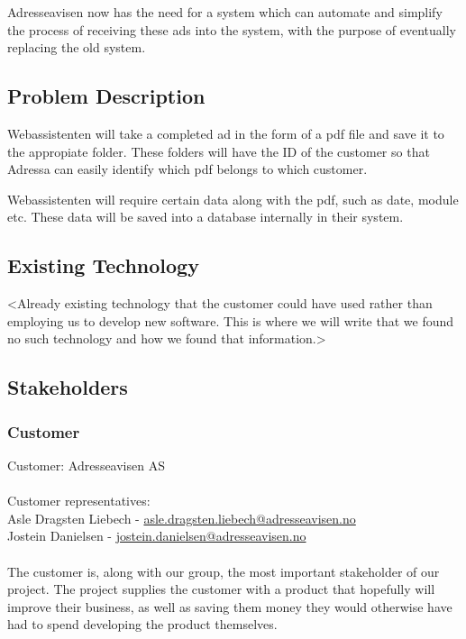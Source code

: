 Adresseavisen now has the need for a system which can automate and simplify the process of receiving these ads into the system, with the purpose of eventually replacing the old system.

\subsection{Problem Description}
Webassistenten will take a completed ad in the form of a pdf file and save it to the appropiate folder. These folders will have the ID of the customer so that Adressa can easily identify which pdf belongs to which customer.

Webassistenten will require certain data along with the pdf, such as date, module etc. These data will be saved into a database internally in their system. %

\subsection{Existing Technology}
<Already existing technology that the customer could have used rather than employing us to develop new software. This is where we will write that we found no such technology and how we found that information.> %

\subsection{Stakeholders}
\subsubsection{Customer}
Customer: Adresseavisen AS\\
\\
Customer representatives:\\
Asle Dragsten Liebech - \href{mailto://asle.dragsten.liebech@adresseavisen.no}{asle.dragsten.liebech@adresseavisen.no}\\
Jostein Danielsen - \href{mailto://josetein.danielsen@adresseavisen.no}{jostein.danielsen@adresseavisen.no}\\
\\
The customer is, along with our group, the most important stakeholder of our project. The project supplies the customer with a product that hopefully will improve their business, as well as saving them money they would otherwise have had to spend developing the product themselves.

